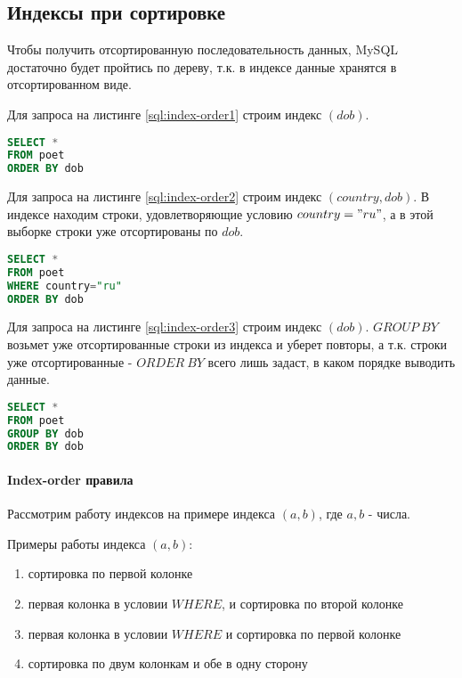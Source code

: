 \subsection{Индексы при сортировке}

Чтобы получить отсортированную последовательность данных, MySQL достаточно будет пройтись по дереву, т.к. в индексе данные хранятся в отсортированном виде. 

Для запроса на листинге \ref{sql:index-order1} строим индекс $(dob)$.
\begin{lstlisting}[language=sql, label=sql:index-order1, caption={запрос для index-order}]
SELECT * 
FROM poet
ORDER BY dob
\end{lstlisting}

Для запроса на листинге \ref{sql:index-order2} строим индекс $(country, dob)$. В индексе находим строки, удовлетворяющие условию $country="ru"$, а в этой выборке строки уже отсортированы по $dob$.
\begin{lstlisting}[language=sql, label=sql:index-order2, caption={запрос для index-order}]
SELECT * 
FROM poet
WHERE country="ru" 
ORDER BY dob
\end{lstlisting}

Для запроса на листинге \ref{sql:index-order3} строим индекс $(dob)$. $GROUP\:BY$ возьмет уже отсортированные строки из индекса и уберет повторы, а т.к. строки уже отсортированные - $ORDER\:BY$ всего лишь задаст, в каком порядке выводить данные. 
\begin{lstlisting}[language=sql, label=sql:index-order3, caption={запрос для index-order}]
SELECT *
FROM poet
GROUP BY dob
ORDER BY dob
\end{lstlisting}


\paragraph{Index-order правила}

Рассмотрим работу индексов на примере индекса $(a, b)$, где $a, b$ - числа.

Примеры работы индекса $(a, b)$:
\begin{enumerate}
\item сортировка по первой колонке
\item первая колонка в условии $WHERE$, и сортировка по второй колонке
\item первая колонка в условии $WHERE$ и сортировка по первой колонке
\item сортировка по двум колонкам и обе в одну сторону
\end{enumerate}

